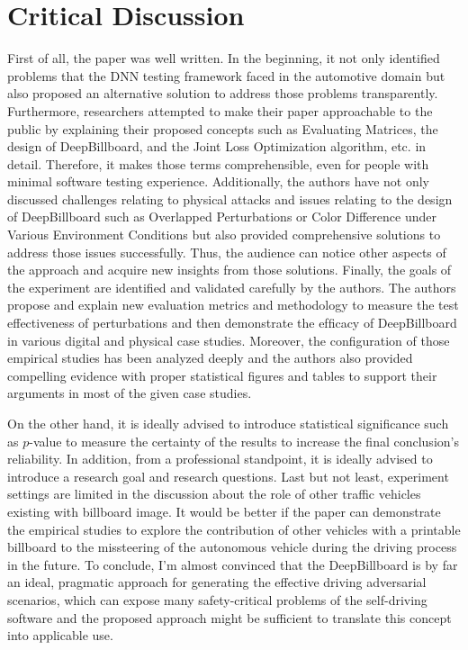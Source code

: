 \documentclass[10pt,a4paper]{report}
\begin{document}
\section{Critical Discussion}
First of all, the paper was well written. In the beginning, it not only identified problems that the DNN testing framework faced in the automotive domain but also proposed an alternative solution to address those problems transparently.
%
Furthermore, researchers attempted to make their paper approachable to the public by explaining their proposed concepts such as Evaluating Matrices, the design of DeepBillboard, and the Joint Loss Optimization algorithm, etc. in detail. 
%
Therefore, it makes those terms comprehensible, even for people with minimal software testing experience.
%
Additionally, the authors have not only discussed challenges relating to physical attacks and issues relating to the design of DeepBillboard such as Overlapped Perturbations or Color Difference under Various Environment Conditions but also provided comprehensive solutions to address those issues successfully.
%
Thus, the audience can notice other aspects of the approach and acquire new insights from those solutions.
%
Finally, the goals of the experiment are identified and validated carefully by the authors.
%
The authors propose and explain new evaluation metrics and methodology to measure the test effectiveness of perturbations and then demonstrate the efﬁcacy of DeepBillboard in various digital and physical case studies.
%
Moreover, the configuration of those empirical studies has been analyzed deeply and the authors also provided compelling evidence with proper statistical figures and tables to support their arguments in most of the given case studies.
%

On the other hand, it is ideally advised to introduce statistical significance such as $p$-value to measure the certainty of the results to increase the final conclusion's reliability.
%
In addition, from a professional standpoint, it is ideally advised to introduce a research goal and research questions.
%
Last but not least, experiment settings are limited in the discussion about the role of other traffic vehicles existing with billboard image.
%
It would be better if the paper can demonstrate the empirical studies to explore the contribution of other vehicles with a printable billboard to the missteering of the autonomous vehicle during the driving process in the future.
%
To conclude, I’m almost convinced that the DeepBillboard is by far an ideal, pragmatic approach for generating the effective driving adversarial scenarios, which can expose many safety-critical problems of the self-driving software and the proposed approach might be sufficient to translate this concept into applicable use.
\end{document}
